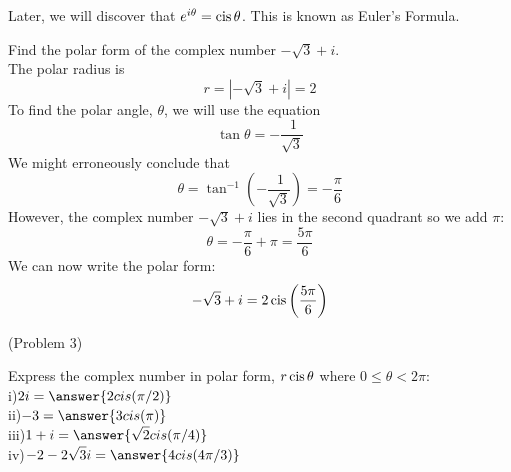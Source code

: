 \documentclass[handout]{ximera}
\begin{document}
\begin{remark}
Later, we will discover that $e^{i\theta} = \operatorname{cis} \theta$. This is known as Euler's Formula.
\end{remark}

\begin{example}[Example 3]
Find the polar form of the complex number $-\sqrt 3 + i$.\\
The polar radius is
\[
r = |-\sqrt 3 + i | =2
\]
To find the polar angle, $\theta$, we will use the equation
\[
\tan \theta = -\frac{\ 1}{\sqrt 3}
\]
We might erroneously conclude that
\[
\theta = \tan^{-1} \left(-\frac{\ 1}{\sqrt 3}\right) = -\frac{\pi}{6}
\]
However, the complex number  $-\sqrt 3 + i$ lies in the second quadrant so we add $\pi$:
\[
\theta = -\frac{\pi}{6} + \pi = \frac{5\pi}{6}
\]
We can now write the polar form:
\[
-\sqrt 3 +i = 2\operatorname{cis} \left(\frac{5\pi}{6}\right)
\]

\begin{image}
\end{image}


\end{example}

\begin{problem}(Problem 3)

Express the complex number in polar form, $r\operatorname{cis} \theta$ where $0 \leq \theta < 2\pi$:\\
i)\quad $\displaystyle 2i = \answer{2cis(\pi/2)} $\\
ii)\quad  $\displaystyle -3= \answer{3cis(\pi)}$ \\
iii)\quad  $\displaystyle 1+i= \answer{\sqrt 2 cis(\pi/4)}$ \\
iv)\quad  $\displaystyle -2-2\sqrt 3i= \answer{4cis(4\pi/3)}$


\end{problem}
\end{document}
